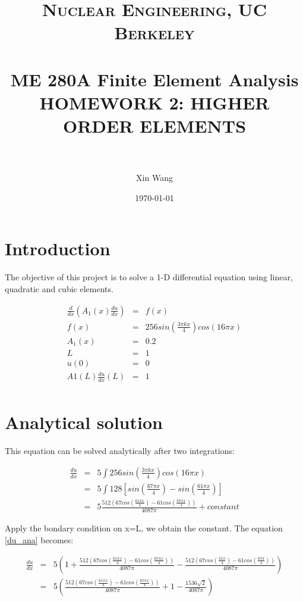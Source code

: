 \documentclass[paper=a4, fontsize=11pt]{article} %
\title{	
\normalfont \normalsize 
\textsc{Nuclear Engineering, UC Berkeley} \\ [25pt] %
\horrule{0.5pt} \\[0.4cm] %
\huge ME 280A Finite Element Analysis \\HOMEWORK 2: HIGHER ORDER ELEMENTS  \\  %
\horrule{2pt} \\[0.5cm] %
}
\author{Xin Wang} %
\date{\normalsize\today} %
\begin{document}
\maketitle %

\newpage
\section{Introduction}
The objective of this project is to solve a 1-D differential equation using linear, quadratic and cubic elements. 

\begin{eqnarray}
\frac{d}{dx}(A_1(x) \frac{du}{dx}) &=& f(x)\nonumber\\
f(x)&=&256sin(\frac{3\pi kx}{4})cos(16 \pi x) \nonumber\\
A_1(x)& = &0.2 \nonumber\\
L&=&1 \nonumber\\
u(0)& =& 0 \nonumber\\
A1(L)\frac{du}{dx}(L) &=& 1 \nonumber\\
\end{eqnarray}


\section{Analytical solution}

This equation can be solved analytically after two integrations:

\begin{eqnarray}
\label{du_ana}
\frac{du}{dx}&=& 5\int 256sin(\frac{3\pi kx}{4})cos(16 \pi x)\nonumber\\
&=& 5\int 128[sin(\frac{67 \pi x}{4}) - sin(\frac{61 \pi x}{4})]\nonumber\\
&=& 5\frac{512(67cos(\frac{61\pi x}{4})- 61cos(\frac{67\pi x}{4}))}{4087\pi} +constant 
\end{eqnarray}

Apply the bondary condition on x=L, we obtain the constant. The equation \ref{du_ana} becomes:

\begin{eqnarray}
\frac{du}{dx}&=& 5(1+ \frac{512(67cos(\frac{61\pi x}{4})- 61cos(\frac{67\pi x}{4}))}{4087\pi} - \frac{512(67cos(\frac{61\pi }{4})- 61cos(\frac{67\pi}{4}))}{4087\pi})\nonumber\\
&=&5(\frac{512(67cos(\frac{61\pi x}{4})- 61cos(\frac{67\pi x}{4}))}{4087\pi} +1 - \frac{1536 \sqrt{2}}{4087\pi})
\end{eqnarray}
\end{document}
